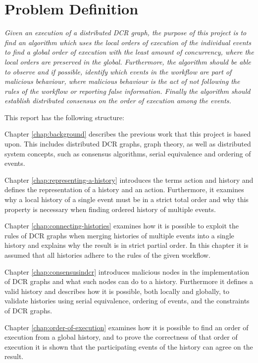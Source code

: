 \section{Problem Definition}
	\textit{Given an execution of a distributed DCR graph, the purpose of this project is to find an algorithm which uses the local orders of execution of the individual events to find a global order of execution with the least amount of concurrency, where the local orders are preserved in the global. Furthermore, the algorithm should be able to observe and if possible, identify which events in the workflow are part of malicious behaviour, where malicious behaviour is the act of not following the rules of the workflow or reporting false information. Finally the algorithm should establish distributed consensus on the order of execution among the events.}
	
	\vspace{0.4cm}
	
	\newpar
	This report has the following structure:
	
	\newpar
	Chapter \ref{chap:background} describes the previous work that this project is based upon. This includes distributed DCR graphs, graph theory, as well as distributed system concepts, such as consensus algorithms, serial equivalence and ordering of events.
		
	\newpar
	Chapter \ref{chap:representing-a-history} introduces the terms action and history and defines the representation of a history and an action.
	Furthermore, it examines why a local history of a single event must be in a strict total order and why this property is necessary when finding ordered history of multiple events. 
		
	\newpar
	Chapter \ref{chap:connecting-histories} examines how it is possible to exploit the rules of DCR graphs when merging histories of multiple events into a single history and explains why the result is in strict partial order. In this chapter it is assumed that all histories adhere to the rules of the given workflow.
	
	\newpar	Chapter \ref{chap:consensusindcr} introduces malicious nodes in the implementation of DCR graphs and what such nodes can do to a history. Furthermore it defines a valid history and describes how it is possible, both locally and globally, to validate histories using serial equivalence, ordering of events, and the constraints of DCR graphs.
	
    \newpar
    Chapter \ref{chap:order-of-execution} examines how it is possible to find an order of execution from a global history, and to prove the correctness of that order of execution it is shown that the participating events of the history can agree on the result.
		
	